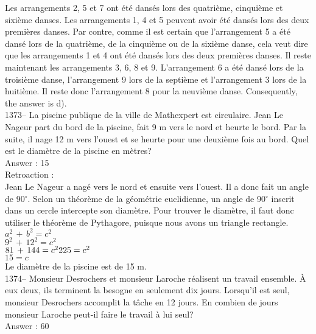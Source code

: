 ﻿\documentclass[letterpaper, 12pt]{article}
\begin{document}
Les arrangements 2, 5 et 7 ont \'et\'e dans\'es lors des quatri\`eme,
cinqui\`eme et sixi\`eme danses.  Les arrangements 1, 4 et 5 peuvent avoir
\'et\'e dans\'es lors des deux premi\`eres danses.  Par contre, comme il est
certain que l'arrangement 5 a \'et\'e dans\'e lors de la quatri\`eme, de la
cinqui\`eme ou de la sixi\`eme danse, cela veut dire que les arrangements 1
et 4 ont \'et\'e dans\'es lors des deux premi\`eres danses.  Il reste
maintenant les arrangements 3, 6, 8 et 9.  L'arrangement 6 a \'et\'e dans\'e
lors de la troisi\`eme danse, l'arrangement 9 lors de la septi\`eme et
l'arrangement 3 lors de la huiti\`eme.  Il reste donc l'arrangement 8 pour
la neuvi\`eme danse.  Consequently, the answer is d).\\

1373-- La piscine publique de la ville de Mathexpert est circulaire.
Jean Le Nageur part du bord de la piscine, fait 9 m vers le nord et
heurte le bord.  Par la suite, il nage 12 m vers l'ouest
et se heurte pour une deuxi\`eme fois au bord.  Quel est le diam\`etre de la
piscine en m\`etres?\\

Answer : 15\\

Retroaction : \\
Jean Le Nageur a nag\'e vers le nord et ensuite vers l'ouest.  Il a donc
fait un angle de 90$^{\circ}$.  Selon un th\'eor\`eme de la g\'eom\'etrie
euclidienne, un angle de 90$^{\circ}$ inscrit dans un cercle intercepte son
diam\`etre.  Pour trouver le diam\`etre, il faut donc utiliser le
th\'eor\`eme de Pythagore, puisque nous avons un triangle rectangle.  \\
$a^{2}\,+\,b^{2}=c^{2}$\\
$9^{2}\,+\,12^{2}=c^{2}$\\
$81\,+\,144=c^{2}\\
225=c^{2}$\\
$15=c$\\
Le diam\`etre de la piscine est de 15 m.\\

1374-- Monsieur Desrochers et monsieur Laroche r\'ealisent un travail
ensemble.  \`A eux deux, ils terminent la besogne en seulement dix jours.
Lorsqu'il est seul, monsieur Desrochers accomplit la t\^ache en 12 jours.
En combien de jours monsieur Laroche peut-il faire le travail \`a lui
seul?\\

Answer : 60\\
\end{document}
